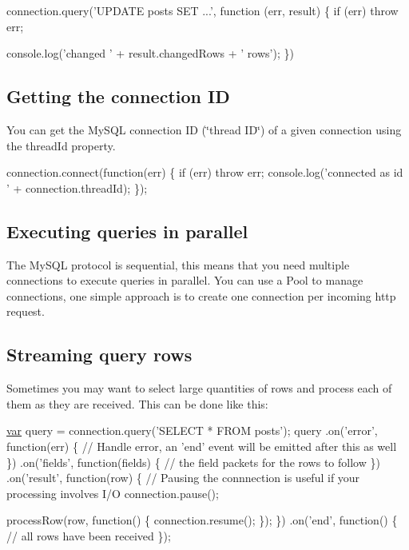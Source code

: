 \begin{DoxyCode}
connection.query(\textcolor{stringliteral}{'UPDATE posts SET ...'}, \textcolor{keyword}{function} (err, result) \{
  \textcolor{keywordflow}{if} (err) \textcolor{keywordflow}{throw} err;

  console.log(\textcolor{stringliteral}{'changed '} + result.changedRows + \textcolor{stringliteral}{' rows'});
\})
\end{DoxyCode}


\subsection*{Getting the connection I\+D}

You can get the My\+S\+Q\+L connection I\+D (\char`\"{}thread I\+D\char`\"{}) of a given connection using the {\ttfamily thread\+Id} property.


\begin{DoxyCode}
connection.connect(\textcolor{keyword}{function}(err) \{
  \textcolor{keywordflow}{if} (err) \textcolor{keywordflow}{throw} err;
  console.log(\textcolor{stringliteral}{'connected as id '} + connection.threadId);
\});
\end{DoxyCode}


\subsection*{Executing queries in parallel}

The My\+S\+Q\+L protocol is sequential, this means that you need multiple connections to execute queries in parallel. You can use a Pool to manage connections, one simple approach is to create one connection per incoming http request.

\subsection*{Streaming query rows}

Sometimes you may want to select large quantities of rows and process each of them as they are received. This can be done like this\+:


\begin{DoxyCode}
\hyperlink{018__def_8c_a335628f2e9085305224b4f9cc6e95ed5}{var} query = connection.query(\textcolor{stringliteral}{'SELECT * FROM posts'});
query
  .on(\textcolor{stringliteral}{'error'}, \textcolor{keyword}{function}(err) \{
    \textcolor{comment}{// Handle error, an 'end' event will be emitted after this as well}
  \})
  .on(\textcolor{stringliteral}{'fields'}, \textcolor{keyword}{function}(fields) \{
    \textcolor{comment}{// the field packets for the rows to follow}
  \})
  .on(\textcolor{stringliteral}{'result'}, \textcolor{keyword}{function}(row) \{
    \textcolor{comment}{// Pausing the connnection is useful if your processing involves I/O}
    connection.pause();

    processRow(row, \textcolor{keyword}{function}() \{
      connection.resume();
    \});
  \})
  .on(\textcolor{stringliteral}{'end'}, \textcolor{keyword}{function}() \{
    \textcolor{comment}{// all rows have been received}
  \});
\end{DoxyCode}


